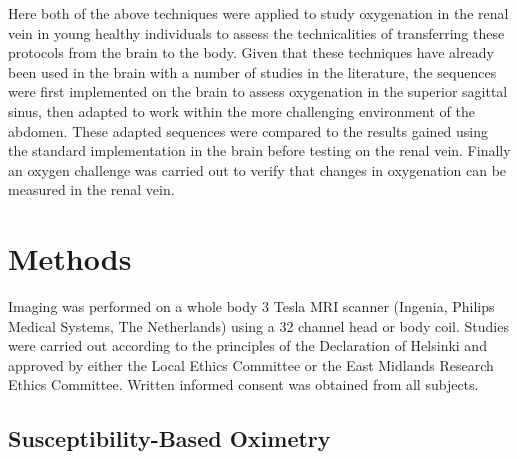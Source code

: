 Here both of the above techniques were applied to study oxygenation in the renal vein in young healthy individuals to assess the technicalities of transferring these protocols from the brain to the body. Given that these techniques have already been used in the brain with a number of studies in the literature, the sequences were first implemented on the brain to assess oxygenation in the superior sagittal sinus, then adapted to work within the more challenging environment of the abdomen. These adapted sequences were compared to the results gained using the standard implementation in the brain before testing on the renal vein. Finally an oxygen challenge was carried out to verify that changes in oxygenation can be measured in the renal vein. 

\section{Methods}

Imaging was performed on a whole body 3 Tesla \ac{MRI} scanner (Ingenia, Philips Medical Systems, The Netherlands) using a 32 channel head or body coil. Studies were carried out according to the principles of the Declaration of Helsinki and approved by either the Local Ethics Committee or the East Midlands Research Ethics Committee. Written informed consent was obtained from all subjects.

\subsection{Susceptibility-Based Oximetry}
\label{sec:SBO}
